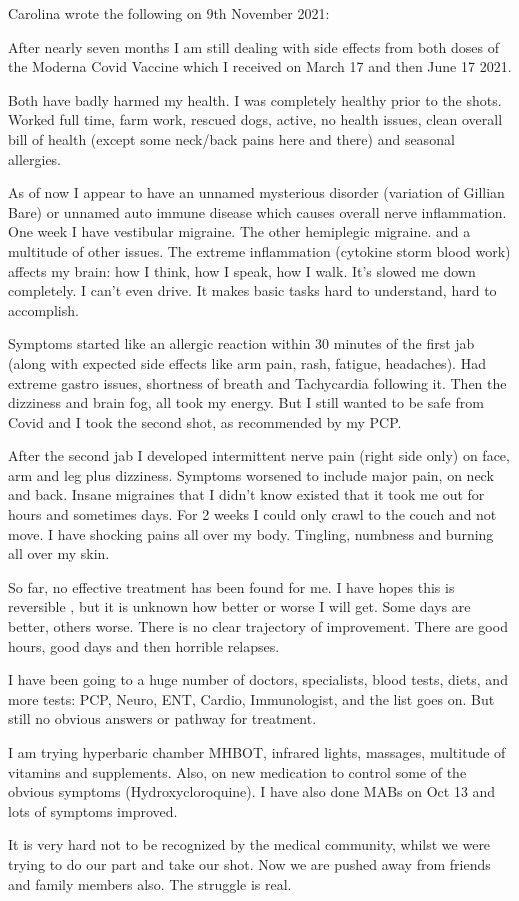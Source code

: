 Carolina wrote the following on 9th November 2021:

After nearly seven months I am still dealing with side effects from both doses
of the Moderna Covid Vaccine which I received on March 17 and then June 17 2021.

Both have badly harmed my health. I was completely healthy prior to the
shots. Worked full time, farm work, rescued dogs, active, no health issues,
clean overall bill of health (except some neck/back pains here and there) and
seasonal allergies.

As of now I appear to have an unnamed mysterious disorder (variation of Gillian
Bare) or unnamed auto immune disease which causes overall nerve
inflammation. One week I have vestibular migraine. The other hemiplegic
migraine. and a multitude of other issues. The extreme inflammation (cytokine
storm blood work) affects my brain: how I think, how I speak, how I walk. It’s
slowed me down completely. I can’t even drive. It makes basic tasks hard to
understand, hard to accomplish.

Symptoms started like an allergic reaction within 30 minutes of the first jab
(along with expected side effects like arm pain, rash, fatigue, headaches). Had
extreme gastro issues, shortness of breath and Tachycardia following it. Then
the dizziness and brain fog, all took my energy. But I still wanted to be safe
from Covid and I took the second shot, as recommended by my PCP.

After the second jab I developed intermittent nerve pain (right side only) on
face, arm and leg plus dizziness. Symptoms worsened to include major pain, on
neck and back. Insane migraines that I didn’t know existed that it took me out
for hours and sometimes days. For 2 weeks I could only crawl to the couch and
not move. I have shocking pains all over my body. Tingling, numbness and burning
all over my skin.

So far, no effective treatment has been found for me. I have hopes this is
reversible , but it is unknown how better or worse I will get. Some days are
better, others worse. There is no clear trajectory of improvement. There are
good hours, good days and then horrible relapses.

I have been going to a huge number of doctors, specialists, blood tests, diets,
and more tests: PCP, Neuro, ENT, Cardio, Immunologist, and the list goes on. But
still no obvious answers or pathway for treatment.

I am trying hyperbaric chamber MHBOT, infrared lights, massages, multitude of
vitamins and supplements. Also, on new medication to control some of the obvious
symptoms (Hydroxycloroquine). I have also done MABs on Oct 13 and lots of
symptoms improved.

It is very hard not to be recognized by the medical community, whilst we were
trying to do our part and take our shot. Now we are pushed away from friends and
family members also. The struggle is real.
